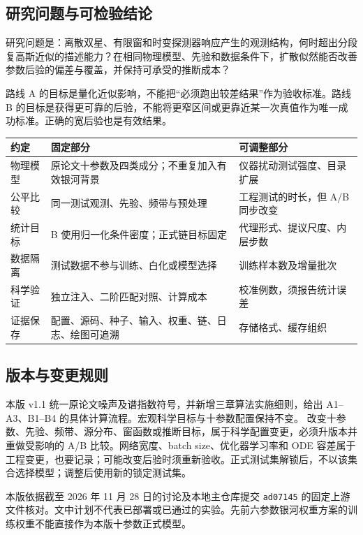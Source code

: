 \documentclass[UTF8,fontset=none,a4paper,11pt]{ctexart}
\begin{document}
\subsection{研究问题与可检验结论}
研究问题是：离散双星、有限窗和时变探测器响应产生的观测结构，何时超出分段复高斯近似的描述能力？在相同物理模型、先验和数据条件下，扩散似然能否改善参数后验的偏差与覆盖，并保持可承受的推断成本？
\par 路线 A 的目标是量化近似影响，不能把“必须跑出较差结果”作为验收标准。路线 B 的目标是获得更可靠的后验，不能将更窄区间或更靠近某一次真值作为唯一成功标准。正确的宽后验也是有效结果。
\par\noindent
\begin{tabularx}{\linewidth}{p{29mm}YY}\toprule
约定 & 固定部分 & 可调整部分\\\midrule
物理模型 & 原论文十参数及四类成分；不重复加入有效银河背景 & 仪器扰动测试强度、目录扩展\\
公平比较 & 同一测试观测、先验、频带与预处理 & 工程测试的时长，但 A/B 同步改变\\
统计目标 & B 使用归一化条件密度；正式链目标固定 & 代理形式、提议尺度、内层步数\\
数据隔离 & 测试数据不参与训练、白化或模型选择 & 训练样本数及增量批次\\
科学验证 & 独立注入、二阶匹配对照、计算成本 & 校准例数，须报告统计误差\\
证据保存 & 配置、源码、种子、输入、权重、链、日志、绘图可追溯 & 存储格式、缓存组织\\\bottomrule
\end{tabularx}
\subsection{版本与变更规则}
本版 v1.1 统一原论文噪声及谱指数符号，并新增三章算法实施细则，给出 A1--A3、B1--B4 的具体计算流程。宏观科学目标与十参数配置保持不变。
改变十参数、先验、频带、源分布、窗函数或推断目标，属于科学配置变更，必须升版本并重做受影响的 A/B 比较。网络宽度、batch size、优化器学习率和 ODE 容差属于工程变更，也要记录；可能改变后验时须重新验收。正式测试集解锁后，不以该集合选择模型；调整后使用新的锁定测试集。
\par 本版依据截至 2026 年 11 月 28 日的讨论及本地主仓库提交 \texttt{ad07145} 的固定上游文件核对。文中计划不代表已部署或已通过的实验。先前六参数银河权重方案的训练权重不能直接作为本版十参数正式模型。
\end{document}
